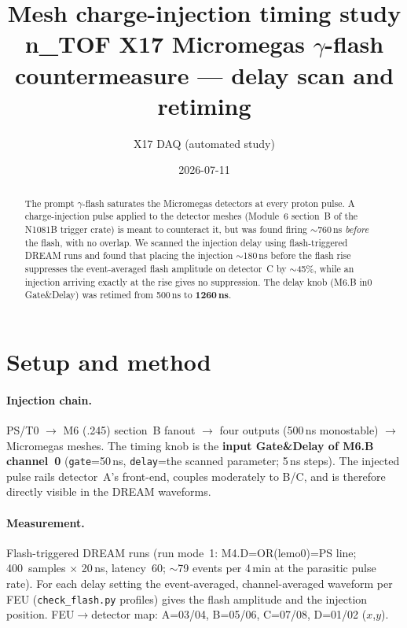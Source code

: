 \documentclass[11pt,a4paper]{article}
\title{Mesh charge-injection timing study\\
\large n\_TOF X17 Micromegas $\gamma$-flash countermeasure --- delay scan and retiming}
\author{X17 DAQ (automated study)}
\date{2026-07-11}
\begin{document}
\maketitle

\begin{abstract}
The prompt $\gamma$-flash saturates the Micromegas detectors at every proton
pulse. A charge-injection pulse applied to the detector meshes
(Module~6 section~B of the N1081B trigger crate) is meant to counteract it,
but was found firing $\sim$760\,ns \emph{before} the flash, with no overlap.
We scanned the injection delay using flash-triggered DREAM runs and found
that placing the injection $\sim$180\,ns before the flash rise suppresses
the event-averaged flash amplitude on detector~C by $\sim$45\%, while an
injection arriving exactly at the rise gives no suppression. The delay knob
(M6.B in0 Gate\&Delay) was retimed from 500\,ns to \textbf{1260\,ns}.
\end{abstract}

\section{Setup and method}

\paragraph{Injection chain.} PS/T0 $\rightarrow$ M6 (.245) section~B fanout
$\rightarrow$ four outputs (500\,ns monostable) $\rightarrow$ Micromegas
meshes. The timing knob is the \textbf{input Gate\&Delay of M6.B channel~0}
(\texttt{gate}=50\,ns, \texttt{delay}=the scanned parameter; 5\,ns steps).
The injected pulse rails detector~A's front-end, couples moderately to
B/C, and is therefore directly visible in the DREAM waveforms.

\paragraph{Measurement.} Flash-triggered DREAM runs (run mode~1:
M4.D=OR(lemo0)=PS line; 400~samples $\times$ 20\,ns, latency~60;
$\sim$79 events per 4\,min at the parasitic pulse rate). For each delay
setting the event-averaged, channel-averaged waveform per FEU
(\texttt{check\_flash.py} profiles) gives the flash amplitude and the
injection position. FEU$\to$detector map: A=03/04, B=05/06, C=07/08,
D=01/02 ($x$,$y$).
\end{document}
